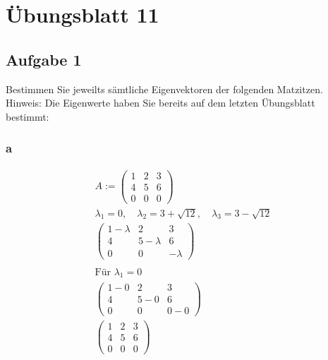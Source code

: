\chapter{Übungsblatt 11}

\section{Aufgabe 1}
Bestimmen Sie jeweilts sämtliche Eigenvektoren der folgenden Matzitzen.
Hinweis: Die Eigenwerte haben Sie bereits auf dem letzten Übungsblatt bestimmt:

\subsection{a}

\begin{align*}
    A := \begin{pmatrix}
             1 & 2 & 3 \\
             4 & 5 & 6 \\
             0 & 0 & 0
         \end{pmatrix}                                                             \\
    \lambda_1 = 0, \quad \lambda_2 = 3 + \sqrt{12}, \quad \lambda_3 = 3 - \sqrt{12} \\
    \begin{pmatrix}
        1 - \lambda & 2           & 3        \\
        4           & 5 - \lambda & 6        \\
        0           & 0           & -\lambda
    \end{pmatrix}                                            \\\\
    \text{Für } \lambda_1 = 0                                                       \\
    \begin{pmatrix}
        1 - 0 & 2     & 3     \\
        4     & 5 - 0 & 6     \\
        0     & 0     & 0 - 0
    \end{pmatrix}                                                           \\
    \begin{pmatrix}
        1 & 2 & 3 \\
        4 & 5 & 6 \\
        0 & 0 & 0
    \end{pmatrix}                                                                  \\

\end{align*}
